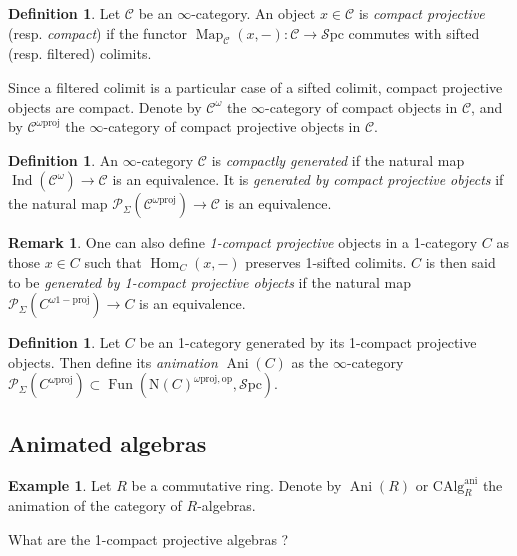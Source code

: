 \documentclass[11pt]{article}
\theoremstyle{definition}
\newtheorem{definition}[theorem]{Definition}
\newtheorem{remark}[theorem]{Remark}
\newtheorem{example}[theorem]{Example}
\newcommand{\Ani}{\operatorname{Ani}}
\newcommand{\ani}{\mathrm{ani}}
\newcommand{\C}{\mathcal{C}}
\newcommand{\CAlg}{\mathrm{CAlg}}
\newcommand{\Fun}{\operatorname{Fun}}
\newcommand{\Hom}{\operatorname{Hom}}
\newcommand{\Ind}{\operatorname{Ind}}
\newcommand{\Map}{\operatorname{Map}}
\newcommand{\N}{\mathrm{N}}
\newcommand{\op}{\mathrm{op}}
\renewcommand{\P}{\mathcal{P}}
\newcommand{\proj}{\mathrm{proj}}
\newcommand{\Spc}{\mathcal{S}\mathrm{pc}}
\begin{document}
\begin{definition}
Let $\C$ be an $\infty$-category.
An object $x \in \C$ is \emph{compact projective} (resp. \emph{compact}) if the functor $\Map_{\C}(x, -) : \C \to \Spc$ commutes with sifted (resp. filtered) colimits.    
\end{definition}
Since a filtered colimit is a particular case of a sifted colimit, compact projective objects are compact.
Denote by $\C^{\omega}$ the $\infty$-category of compact objects in $\C$, and by $\C^{\omega\proj}$ the $\infty$-category of compact projective objects in $\C$.

\begin{definition}
    An $\infty$-category $\C$ is \emph{compactly generated} if the natural map $\Ind(\C^{\omega}) \to \C$ is an equivalence.
    It is \emph{generated by compact projective objects} if the natural map $\P_{\Sigma}(\C^{\omega\proj}) \to \C$ is an equivalence.
\end{definition}

\begin{remark}
    One can also define \emph{1-compact projective} objects in a 1-category $C$ as those $x \in C$ such that $\Hom_{C}(x, -)$ preserves 1-sifted colimits.
    $C$ is then said to be \emph{generated by 1-compact projective objects} if the natural map $\P_{\Sigma}(C^{\omega\mathrm{1-proj}}) \to C$ is an equivalence.
\end{remark}

\begin{definition}
    Let $C$ be an 1-category generated by its 1-compact projective objects.
    Then define its \emph{animation} $\Ani(C)$ as the $\infty$-category $\P_{\Sigma}(C^{\omega\proj}) \subset \Fun(\N(C)^{\omega\proj, \op}, \Spc)$.
\end{definition}

\subsection{Animated algebras}

\begin{example}
    Let $R$ be a commutative ring.
    Denote by $\Ani(R)$ or $\CAlg_R^{\ani}$ the animation of the category of $R$-algebras.
\end{example}
What are the 1-compact projective algebras ?
\end{document}
